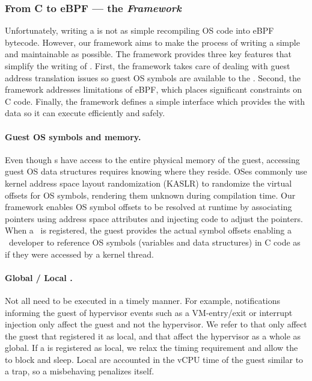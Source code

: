 \documentclass[11pt]{article}
\begin{document}
\subsubsection{From C to eBPF --- the \emph{Framework}}

Unfortunately, writing a \hypercallback{} is not as simple recompiling
OS code into eBPF bytecode. However, our 
framework aims to make the process of writing a  simple and 
maintainable as possible. The framework provides three key features that simplify 
the writing of . First, the framework takes care of dealing with 
guest address translation issues so guest OS symbols are available to the 
\hypercallback. Second, the framework addresses limitations of eBPF, 
which places significant constraints on C code. Finally, the framework 
defines a simple interface which provides the \hypercallback{} with data so 
it can execute efficiently and safely.

\paragraph{Guest OS symbols and memory.} Even though \hypercallback{}s have access 
to the entire physical memory of the guest, accessing guest OS data structures
 requires knowing where they reside.
OSes commonly use kernel address space layout randomization (KASLR) to randomize
the virtual offsets for OS symbols, 
rendering them unknown during compilation time. Our framework enables OS symbol 
offsets to be resolved at runtime by associating pointers %
using address space attributes and injecting code to adjust the pointers.
When a \hypercallback~is registered, the guest provides the actual symbol 
offsets enabling a \hypercallback~developer to reference OS symbols 
(variables and data structures) in C code as if they were accessed by a kernel thread.

\paragraph{Global / Local .} Not all  need 
to be executed in a timely manner. For example, notifications informing the 
guest of hypervisor events such as a VM-entry/exit or interrupt injection 
only affect the guest and not the hypervisor. We refer to   
that only affect the guest that registered it as local, and  
that affect the hypervisor as a whole as global. If a \hypercallback{} is 
registered as local, we relax the timing requirement and allow the 
\hypercallback{} to block and sleep. Local  are accounted 
in the vCPU time of the guest similar to a trap, so a misbehaving \hypercallback{} 
penalizes itself. 
\end{document}
